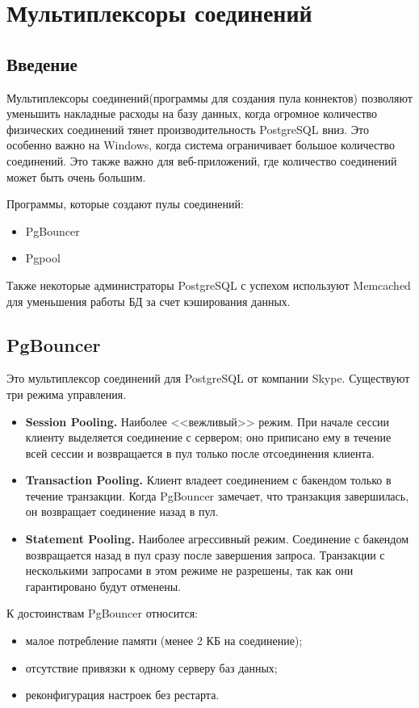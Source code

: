 \chapter{Мультиплексоры соединений}
\section{Введение}
Мультиплексоры соединений(программы для создания пула коннектов) позволяют уменьшить накладные расходы на базу данных, 
когда огромное количество физических соединений тянет производительность PostgreSQL вниз. 
Это особенно важно на Windows, когда система ограничивает большое количество соединений. 
Это также важно для веб-приложений, где количество соединений может быть очень большим.

Программы, которые создают пулы соединений:
\begin{itemize}
\item PgBouncer
\item Pgpool
\end{itemize}

Также некоторые администраторы PostgreSQL с успехом используют Memcached для уменьшения работы БД 
за счет кэширования данных.

\section{PgBouncer}
Это мультиплексор соединений для PostgreSQL от компании Skype. Существуют три режима управления.
\begin{itemize}
\item \textbf{Session Pooling.}
Наиболее <<вежливый>> режим. При начале сессии клиенту выделяется соединение с сервером; 
оно приписано ему в течение всей сессии и возвращается в пул только после отсоединения клиента. 
\item \textbf{Transaction Pooling.} 
Клиент владеет соединением с бакендом только в течение транзакции. Когда PgBouncer замечает, 
что транзакция завершилась, он возвращает соединение назад в пул. 
\item \textbf{Statement Pooling.} 
Наиболее агрессивный режим. Соединение с бакендом возвращается назад в пул сразу после завершения 
запроса. Транзакции с несколькими запросами в этом режиме не разрешены, так как они гарантировано будут отменены.
\end{itemize}

К достоинствам PgBouncer относится:
\begin{itemize}
\item малое потребление памяти (менее 2 КБ на соединение);
\item отсутствие привязки к одному серверу баз данных;
\item реконфигурация настроек без рестарта.
\end{itemize}

